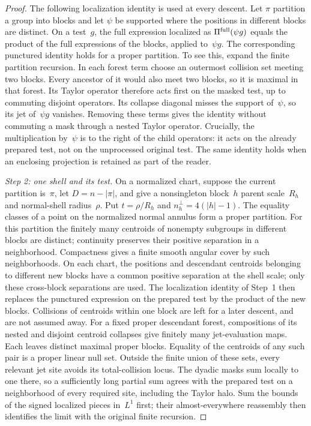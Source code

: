 \begin{proof}
The following localization identity is used at every descent. Let $\pi$ partition a group into blocks and let $\psi$ be supported where the positions in different blocks are distinct. On a test~$g$, the full expression localized as $\Pi^{\rm full} (\psi g)$ equals the product of the full expressions of the blocks, applied to~$\psi g$. The corresponding punctured identity holds for a proper partition. To see this, expand the finite partition recursion. In each forest term choose an outermost collision set meeting two blocks. Every ancestor of it would also meet two blocks, so it is maximal in that forest. Its Taylor operator therefore acts first on the masked test, up to commuting disjoint operators. Its collapse diagonal misses the support of~$\psi$, so its jet of~$\psi g$ vanishes. Removing these terms gives the identity without commuting a mask through a nested Taylor operator. Crucially, the multiplication by~$\psi$ is to the right of the child operators: it acts on the already prepared test, not on the unprocessed original test. The same identity holds when an enclosing projection is retained as part of the reader.

\emph{Step 2: one shell and its test.} On a normalized chart, suppose the current partition is~$\pi$, let $D=n-|\pi|$, and give a nonsingleton block~$h$ parent scale~$R_h$ and normal-shell radius~$\rho$. Put $t=\rho/R_h$ and $n_h^\perp=4(|h|-1)$. The equality classes of a point on the normalized normal annulus form a proper partition. For this partition the finitely many centroids of nonempty subgroups in different blocks are distinct; continuity preserves their positive separation in a neighborhood. Compactness gives a finite smooth angular cover by such neighborhoods. On each chart, the positions and descendant centroids belonging to different new blocks have a common positive separation at the shell scale; only these cross-block separations are used. The localization identity of Step~1 then replaces the punctured expression on the prepared test by the product of the new blocks. Collisions of centroids within one block are left for a later descent, and are not assumed away. For a fixed proper descendant forest, compositions of its nested and disjoint centroid collapses give finitely many jet-evaluation maps. Each leaves distinct maximal proper blocks. Equality of the centroids of any such pair is a proper linear null set. Outside the finite union of these sets, every relevant jet site avoids its total-collision locus. The dyadic masks sum locally to one there, so a sufficiently long partial sum agrees with the prepared test on a neighborhood of every required site, including the Taylor halo. Sum the bounds of the signed localized pieces in~$L^1$ first; their almost-everywhere reassembly then identifies the limit with the original finite recursion.


\end{proof}
